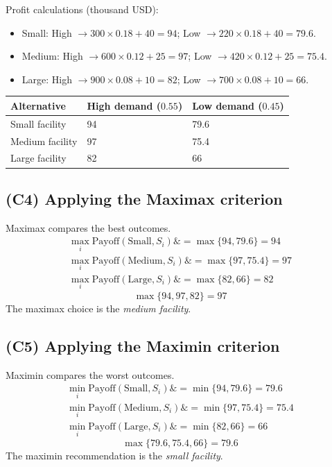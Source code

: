\documentclass[11pt]{article}
\begin{document}
	Profit calculations (thousand USD):
	\begin{itemize}
		\item Small: High $\to 300 \times 0.18 + 40 = 94$; Low $\to 220 \times 0.18 + 40 = 79.6$.
		\item Medium: High $\to 600 \times 0.12 + 25 = 97$; Low $\to 420 \times 0.12 + 25 = 75.4$.
		\item Large: High $\to 900 \times 0.08 + 10 = 82$; Low $\to 700 \times 0.08 + 10 = 66$.
	\end{itemize}
	\begin{center}
		\begin{tabular}{lll}
			\toprule
			Alternative & High demand
			($0.55$) & Low demand
			($0.45$) \\
			\midrule
			Small facility & 94 & 79.6 \\
			Medium facility & 97 & 75.4 \\
			Large facility & 82 & 66 \\
			\bottomrule
		\end{tabular}
	\end{center}
	
	\subsection*{(C4) Applying the Maximax criterion}
	
	\hypertarget{problem8-c4}{}
	
	Maximax compares the best outcomes.
	\[
	\begin{aligned}
		\max_i \text{Payoff}(\text{Small}, S_i) \&= \max\{94, 79.6\} = 94 \\
		\max_i \text{Payoff}(\text{Medium}, S_i) \&= \max\{97, 75.4\} = 97 \\
		\max_i \text{Payoff}(\text{Large}, S_i) \&= \max\{82, 66\} = 82
	\end{aligned}
	\]
	\[
	\max\{94, 97, 82\} = 97
	\]
	The maximax choice is the \emph{medium facility}.
	
	\subsection*{(C5) Applying the Maximin criterion}
	
	\hypertarget{problem8-c5}{}
	
	Maximin compares the worst outcomes.
	\[
	\begin{aligned}
		\min_i \text{Payoff}(\text{Small}, S_i) \&= \min\{94, 79.6\} = 79.6 \\
		\min_i \text{Payoff}(\text{Medium}, S_i) \&= \min\{97, 75.4\} = 75.4 \\
		\min_i \text{Payoff}(\text{Large}, S_i) \&= \min\{82, 66\} = 66
	\end{aligned}
	\]
	\[
	\max\{79.6, 75.4, 66\} = 79.6
	\]
	The maximin recommendation is the \emph{small facility}.
	
\end{document}
